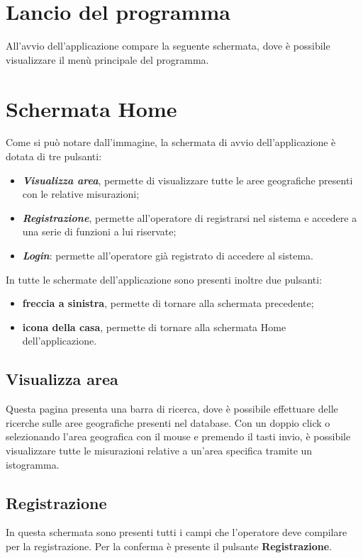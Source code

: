 \section{Lancio del programma}
All’avvio dell’applicazione compare la seguente schermata, dove è possibile visualizzare il menù principale del programma.
\section{Schermata Home}
Come si può notare dall'immagine, la schermata di avvio dell'applicazione è dotata di tre pulsanti:
\begin{itemize}
	\item \textbf{\textit{Visualizza area}}, permette di visualizzare tutte le aree geografiche presenti con le relative misurazioni;
	\item \textbf{\textit{Registrazione}}, permette all'operatore di registrarsi nel sistema e accedere a una serie di funzioni a lui riservate;
	\item \textbf{\textit{Login}}: permette all'operatore già registrato di accedere al sistema. 
\end{itemize}
In tutte le schermate dell'applicazione sono presenti inoltre due pulsanti:
\begin{itemize}
	\item \textbf{freccia a sinistra}, permette di tornare alla schermata precedente;
	\item \textbf{icona della casa}, permette di tornare alla schermata Home dell'applicazione.
\end{itemize}
\subsection{Visualizza area}\label{VisualizzaArea}
Questa pagina presenta una barra di ricerca, dove è possibile effettuare delle ricerche sulle aree geografiche presenti nel database.
Con un doppio click o selezionando l'area geografica con il mouse e premendo il tasti invio, è possibile visualizzare tutte le misurazioni relative a un'area specifica tramite un istogramma.

\subsection{Registrazione}
In questa schermata sono presenti tutti i campi che l'operatore deve compilare per la registrazione. Per la conferma è presente il pulsante \textbf{Registrazione}.


